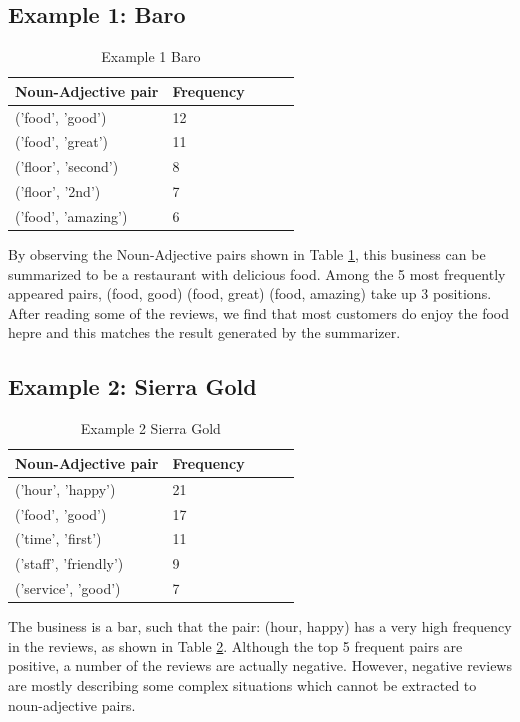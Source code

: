 \documentclass[sigconf]{acmart}
\begin{document}
\subsection{Example 1: Baro}
\begin{table}
  \caption{Example 1 Baro}
  \label{tab:n_adj_1}
  \begin{tabular}{lllll}
    \toprule
    Noun-Adjective pair & Frequency \\
    \midrule
    ('food', 'good') & 12\\
    ('food', 'great') & 11\\
    ('floor', 'second') & 8\\
    ('floor', '2nd') & 7\\
    ('food', 'amazing') & 6\\
\end{tabular}
\end{table}

By observing the Noun-Adjective pairs shown in Table \ref{tab:n_adj_1}, this business can be summarized to be a restaurant with delicious food. Among the 5 most frequently appeared pairs, (food, good) (food, great) (food, amazing) take up 3 positions. 
After reading some of the reviews, we find that most customers do enjoy the food hepre and this matches the result generated by the summarizer.

\subsection{Example 2: Sierra Gold}
\begin{table}
  \caption{Example 2 Sierra Gold}
  \label{tab:n_adj_2}
  \begin{tabular}{lllll}
    \toprule
    Noun-Adjective pair & Frequency \\
    \midrule
    ('hour', 'happy') & 21\\
    ('food', 'good') & 17\\
    ('time', 'first') & 11\\
    ('staff', 'friendly') & 9\\
    ('service', 'good') & 7\\
\end{tabular}
\end{table}

The business is a bar, such that the pair: (hour, happy) has a very high frequency in the reviews, as shown in Table \ref{tab:n_adj_2}. Although the top 5 frequent pairs are positive, a number of the reviews are actually negative. However, negative reviews are mostly describing some complex situations which cannot be extracted to noun-adjective pairs.
\end{document}

